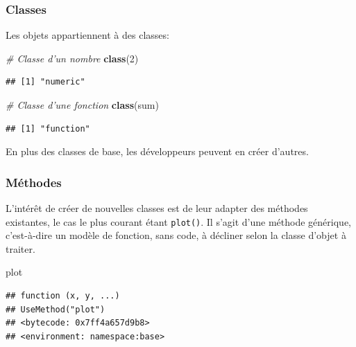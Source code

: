 \documentclass[
  12pt,
  french,
  a4paper,
  extrafontsizes,onecolumn,openright
  ]{memoir}
\newenvironment{Shaded}{\begin{snugshade}}{\end{snugshade}}
\newcommand{\CommentTok}[1]{\textcolor[rgb]{0.56,0.35,0.01}{\textit{#1}}}
\newcommand{\DecValTok}[1]{\textcolor[rgb]{0.00,0.00,0.81}{#1}}
\newcommand{\KeywordTok}[1]{\textcolor[rgb]{0.13,0.29,0.53}{\textbf{#1}}}
\newcommand{\NormalTok}[1]{#1}
\begin{document}
\hypertarget{classes}{%
\subsubsection{Classes}\label{classes}}

Les objets appartiennent à des classes:

\scriptsize

\begin{Shaded}
\begin{Highlighting}[]
\CommentTok{# Classe d'un nombre}
\KeywordTok{class}\NormalTok{(}\DecValTok{2}\NormalTok{)}
\end{Highlighting}
\end{Shaded}

\begin{verbatim}
## [1] "numeric"
\end{verbatim}

\begin{Shaded}
\begin{Highlighting}[]
\CommentTok{# Classe d'une fonction}
\KeywordTok{class}\NormalTok{(sum)}
\end{Highlighting}
\end{Shaded}

\begin{verbatim}
## [1] "function"
\end{verbatim}

\normalsize

En plus des classes de base, les développeurs peuvent en créer d'autres.

\hypertarget{muxe9thodes}{%
\subsubsection{Méthodes}\label{muxe9thodes}}

L'intérêt de créer de nouvelles classes est de leur adapter des méthodes existantes, le cas le plus courant étant \texttt{plot()}.
Il s'agit d'une méthode générique, c'est-à-dire un modèle de fonction, sans code, à décliner selon la classe d'objet à traiter.

\scriptsize

\begin{Shaded}
\begin{Highlighting}[]
\NormalTok{plot}
\end{Highlighting}
\end{Shaded}

\begin{verbatim}
## function (x, y, ...) 
## UseMethod("plot")
## <bytecode: 0x7ff4a657d9b8>
## <environment: namespace:base>
\end{verbatim}
\end{document}

